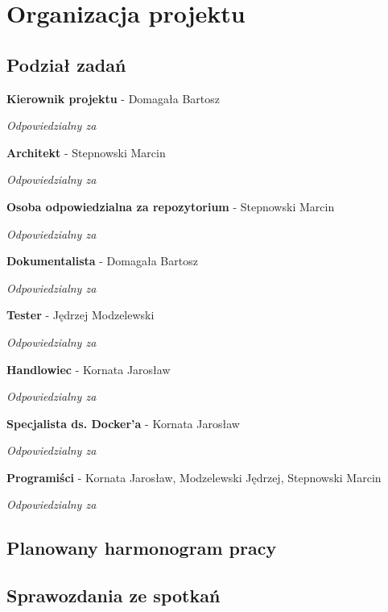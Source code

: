 \chapter{Organizacja projektu}
\section{Podział zadań}

\par{\textbf{Kierownik projektu} - Domagała Bartosz}
\par{\textit{Odpowiedzialny za}}

\par{\textbf{Architekt} - Stepnowski Marcin}
\par{\textit{Odpowiedzialny za}}

\par{\textbf{Osoba odpowiedzialna za repozytorium} - Stepnowski Marcin}
\par{\textit{Odpowiedzialny za}}

\par{\textbf{Dokumentalista} - Domagała Bartosz}
\par{\textit{Odpowiedzialny za}}

\par{\textbf{Tester} - Jędrzej Modzelewski}
\par{\textit{Odpowiedzialny za}}

\par{\textbf{Handlowiec} - Kornata Jarosław}
\par{\textit{Odpowiedzialny za}}

\par{\textbf{Specjalista ds. Docker'a} - Kornata Jarosław}
\par{\textit{Odpowiedzialny za}}

\par{\textbf{Programiści} - Kornata Jarosław, Modzelewski Jędrzej, Stepnowski Marcin}
\par{\textit{Odpowiedzialny za}}

\section{Planowany harmonogram pracy}

\par{}

\section{Sprawozdania ze spotkań}

